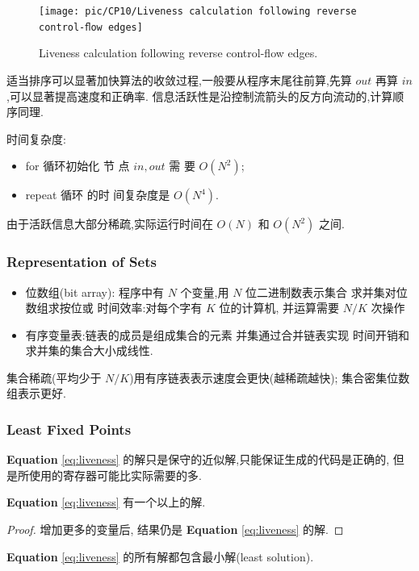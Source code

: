 \begin{figure}[!htb]
    \centering
    \texttt{[image: pic/CP10/Liveness calculation following reverse control-ﬂow edges]}
    \caption{Liveness calculation following reverse control-ﬂow edges.}
\end{figure}

适当排序可以显著加快算法的收敛过程,一般要从程序末尾往前算,先算 $out$ 再算 $in$,可以显著提高速度和正确率. 信息活跃性是沿控制流箭头的反方向流动的,计算顺序同理.


时间复杂度: 
\begin{itemize}
    \item for 循环初始化 节 点 $in,out$ 需 要 $O(N^2)$; 
    \item repeat 循环 的时 间复杂度是 $O(N^4)$.
\end{itemize}
由于活跃信息大部分稀疏,实际运行时间在 $O(N)$ 和 $O(N^2)$ 之间.

\subsubsection{Representation of Sets}
\begin{itemize}
    \item 位数组(bit array): 程序中有 $N$ 个变量,用 $N$ 位二进制数表示集合
    \subitem 求并集对位数组求按位或
    \subitem 时间效率:对每个字有 $K$ 位的计算机, 并运算需要 $N/K$ 次操作
    \item 有序变量表:链表的成员是组成集合的元素
    \subitem 并集通过合并链表实现
    \subitem 时间开销和求并集的集合大小成线性.
\end{itemize}

集合稀疏(平均少于 $N/K$)用有序链表表示速度会更快(越稀疏越快); 集合密集位数组表示更好.

\subsubsection{Least Fixed Points}
\textbf{Equation} \ref{eq:liveness} 的解只是保守的近似解,只能保证生成的代码是正确的, 但是所使用的寄存器可能比实际需要的多. 

\begin{theorem}
    \textbf{Equation} \ref{eq:liveness} 有一个以上的解.
\end{theorem}
\begin{proof}
    增加更多的变量后, 结果仍是 \textbf{Equation} \ref{eq:liveness} 的解.
\end{proof}

\begin{theorem}
    \textbf{Equation} \ref{eq:liveness} 的所有解都包含最小解(least solution). 
\end{theorem}

